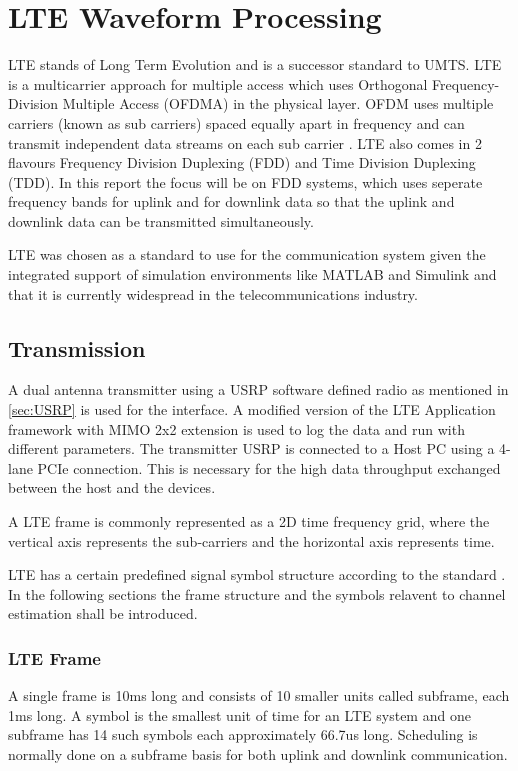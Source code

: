 \section{LTE Waveform Processing}\label{sec:LTE Waveform Processing}
LTE stands of Long Term Evolution and is a successor standard to UMTS. LTE is a multicarrier approach for multiple access which uses Orthogonal Frequency-Division Multiple Access (OFDMA) in the physical layer. OFDM uses multiple carriers (known as sub carriers) spaced equally apart in frequency and can transmit independent data streams on each sub carrier \cite{rohling}. LTE also comes in 2 flavours Frequency Division Duplexing (FDD) and Time Division Duplexing (TDD). In this report the focus will be on FDD systems, which uses seperate frequency bands for uplink and for downlink data so that the uplink and downlink data can be transmitted simultaneously.

LTE was chosen as a standard to use for the communication system given the integrated support of simulation environments like MATLAB and Simulink and that it is currently widespread in the telecommunications industry. 

\subsection{Transmission}

A dual antenna transmitter using a USRP software defined radio as mentioned in \ref{sec:USRP} is used for the interface. A modified version of the LTE Application framework with MIMO 2x2 extension is used to log the data and run with different parameters. The transmitter USRP is connected to a Host PC using a 4-lane PCIe connection. This is necessary for the high data throughput exchanged between the host and the devices.

A LTE frame is commonly represented as a 2D time frequency grid, where the vertical axis represents the sub-carriers and the horizontal axis represents time.

LTE has a certain predefined signal symbol structure according to the standard \cite{3gpp36211}. In the following sections the frame structure and the symbols relavent to channel estimation shall be introduced.

\subsubsection{LTE Frame} \label{LTEFrame}

A single frame is 10ms long and consists of 10 smaller units called subframe, each 1ms long. A symbol is the smallest unit of time for an LTE system and one subframe has 14 such symbols each approximately 66.7us long. Scheduling is normally done on a subframe basis for both uplink and downlink communication.

